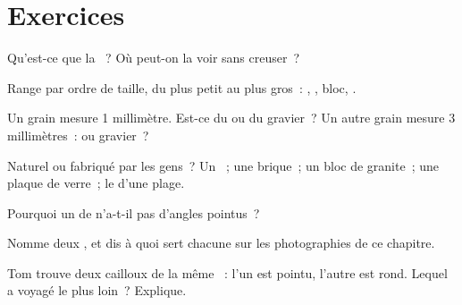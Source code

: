 \section{Exercices}

\begin{exercise}[$\star$]\label{exo:g3:stones-pebbles-sand:1}
Qu'est-ce que la ~? Où peut-on la voir sans creuser~?
\end{exercise}

\begin{exercise}[$\star$]\label{exo:g3:stones-pebbles-sand:2}
Range par ordre de taille, du plus petit au plus gros~: , , bloc,
.
\end{exercise}

\begin{exercise}[$\star$]\label{exo:g3:stones-pebbles-sand:3}
Un grain mesure 1 millimètre. Est-ce du  ou du gravier~? Un autre
grain mesure 3 millimètres~:  ou gravier~?
\end{exercise}

\begin{exercise}[$\star$]\label{exo:g3:stones-pebbles-sand:4}
Naturel ou fabriqué par les gens~? Un ~; une brique~; un bloc de
granite~; une plaque de verre~; le  d'une plage.
\end{exercise}

\begin{exercise}[$\star$]\label{exo:g3:stones-pebbles-sand:5}
Pourquoi un  de  n'a-t-il pas d'angles pointus~?
\end{exercise}

\begin{exercise}[$\star$]\label{exo:g3:stones-pebbles-sand:6}
Nomme deux , et dis à quoi sert chacune sur les
photographies de ce chapitre.
\end{exercise}

\begin{exercise}[$\star\star$]\label{exo:g3:stones-pebbles-sand:7}
Tom trouve deux cailloux de la même ~: l'un est pointu, l'autre est
rond. Lequel a voyagé le plus loin~? Explique.
\end{exercise}

